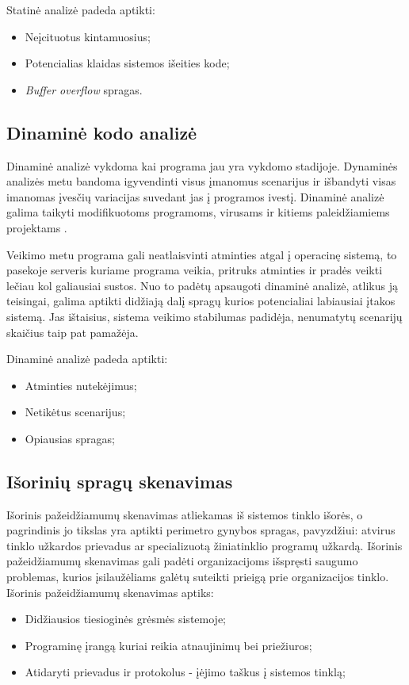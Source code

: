\documentclass[a4paper,12pt,fleqn]{article}
\begin{document}
Statinė analizė padeda aptikti:
\begin{itemize}
	\item Neįcituotus kintamuosius;
	\item Potencialias klaidas sistemos išeities kode;
	\item \textit{Buf{}fer overflow} spragas.
\end{itemize}



\subsection{Dinaminė kodo analizė}
\label{sec:example}


\label{sec:data}
Dinaminė analizė vykdoma kai programa jau yra vykdomo stadijoje. Dynaminės analizės metu bandoma igyvendinti visus įmanomus scenarijus ir išbandyti visas imanomas įvesčių variacijas suvedant jas į programos ivestį. Dinaminė analizė galima taikyti modifikuotoms programoms, virusams ir kitiems paleidžiamiems projektams \cite{bayer2006dynamic}.

Veikimo metu programa gali neatlaisvinti atminties atgal į operacinę sistemą, to pasekoje serveris kuriame programa veikia, pritruks atminties ir pradės veikti lečiau kol galiausiai sustos. Nuo to padėtų apsaugoti dinaminė analizė, atlikus ją teisingai, galima aptikti didžiają dalį spragų kurios potencialiai labiausiai įtakos sistemą. Jas ištaisius, sistema veikimo stabilumas padidėja, nenumatytų scenarijų skaičius taip pat pamažėja.

Dinaminė analizė padeda aptikti:
\begin{itemize}
	\item Atminties nutekėjimus;
	\item Netikėtus scenarijus;
	\item Opiausias spragas;
\end{itemize}

\subsection{Išorinių spragų skenavimas}
\label{sec:example}

Išorinis pažeidžiamumų skenavimas atliekamas iš sistemos tinklo išorės, o pagrindinis jo tikslas yra aptikti perimetro gynybos spragas, pavyzdžiui: atvirus tinklo užkardos prievadus ar specializuotą žiniatinklio programų užkardą\cite{gula1999passive}. Išorinis pažeidžiamumų skenavimas gali padėti organizacijoms išspręsti saugumo problemas, kurios įsilaužėliams galėtų suteikti prieigą prie organizacijos tinklo.
\newline
Išorinis pažeidžiamumų skenavimas aptiks:
\begin{itemize}
	\item Didžiausios tiesioginės grėsmės sistemoje;
	\item Programinę įrangą kuriai reikia atnaujinimų bei priežiuros;
	\item Atidaryti prievadus ir protokolus - įėjimo taškus į sistemos tinklą;
\end{itemize}
\end{document}
